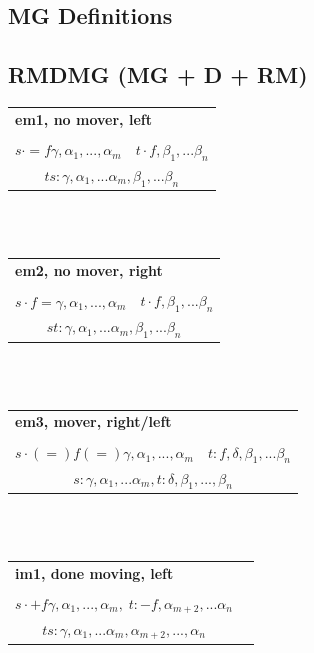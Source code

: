 \documentclass[12pt]{article}
\begin{document}
\begin{landscape}
\newpage 

\section{MG Definitions}

\subsection{RMDMG (MG + D + RM)}

\begin{tabular}{cc}
\multicolumn{2}{l}{\textbf{em1, no mover, left}}\\
& \\
$s\cdot =\!f \gamma, \alpha_1,...,\alpha_m$ & $t \cdot f, \beta_1,...\beta_n $\\
\hline
\multicolumn{2}{c}{$ts : \gamma,\alpha_1,...\alpha_m,\beta_1,...\beta_n$}
\end{tabular} \\ \\

\noindent\begin{tabular}{cc}
\multicolumn{2}{l}{\textbf{em2, no mover, right}}\\
& \\
$s\cdot f\!= \gamma, \alpha_1,...,\alpha_m$ & $t \cdot f, \beta_1,...\beta_n $\\
\hline
\multicolumn{2}{c}{$st : \gamma,\alpha_1,...\alpha_m,\beta_1,...\beta_n$}
\end{tabular} \\ \\

\noindent\begin{tabular}{cc}
\multicolumn{2}{l}{\textbf{em3, mover, right/left}}\\
& \\
$s\cdot (=)\!f\!(=) \gamma, \alpha_1,...,\alpha_m$ & $t : f, \delta,\beta_1,...\beta_n$ \\
\hline
\multicolumn{2}{c}{$s : \gamma,\alpha_1,...\alpha_m, t : \delta,\beta_1,...,\beta_n$}
\end{tabular} \\ \\

\noindent\begin{tabular}{cc}
\multicolumn{2}{l}{\textbf{im1, done moving, left}}\\
& \\
$s\cdot +\!f \gamma, \alpha_1,...,\alpha_m,\; t : -f, \alpha_{m+2},...\alpha_n $ \\
\hline
$ts : \gamma,\alpha_1,...\alpha_m,\alpha_{m+2},...,\alpha_n$
\end{tabular} \\ \\


\end{landscape}
\end{document}
